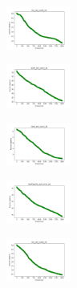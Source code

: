 \vspace*{\fill}
\newpage
\vspace*{\fill}

\begin{figure}[H]
    \centering
    \begin{subfigure}
        \centering
        \includegraphics[width=0.234\textwidth]{img/ageun/iris_set_const_20_949004259_cost.png}
    \end{subfigure}
    \hfill
    \begin{subfigure}
        \centering
        \includegraphics[width=0.234\textwidth]{img/ageun/ecoli_set_const_20_949004259_cost.png}
    \end{subfigure}
    \hfill
    \begin{subfigure}
        \centering
        \includegraphics[width=0.234\textwidth]{img/ageun/rand_set_const_20_949004259_cost.png}
    \end{subfigure}
    \hfill
    \begin{subfigure}
        \centering
        \includegraphics[width=0.234\textwidth]{img/ageun/newthyroid_set_const_20_949004259_cost.png}
    \end{subfigure}
    \hfill
    \begin{subfigure}
        \centering
        \includegraphics[width=0.234\textwidth]{img/ageun/iris_set_const_20_589741062_cost.png}

\end{subfigure}
\end{figure}

